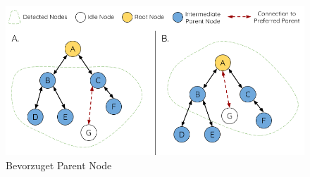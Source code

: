 \begin{figure}[H] \begin{center}
    \includegraphics[scale=0.5]{diagrams/mesh-preferred-parent-node.png}
    \caption{Bevorzuget Parent Node \cite{esp-mesh}}
    \end{center}    
\end{figure}

